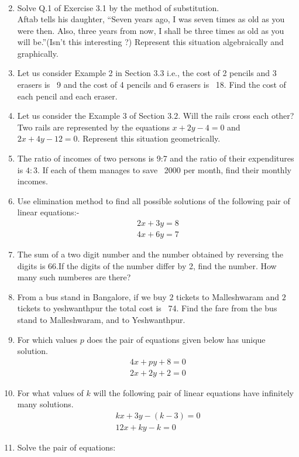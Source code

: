 \documentclass{article}
\theoremstyle{remark}
\begin{document}
\begin{enumerate}
\begin{align}
\end{align}
\item Solve Q.1 of Exercise 3.1 by the method of substitution.
\\ Aftab tells his daughter, \textquotedblleft Seven years ago, I was seven times as old as you were then. Also, three years from now, I shall be three times as old as you will be.\textquotedblright  (Isn't this interesting ?) Represent this situation algebraically and graphically.
\item Let us consider Example 2 in Section $3.3$ i.e., the cost of 2 pencils and 3 erasers is \rupee~9 and the cost of 4 pencils and 6 erasers is \rupee~18. Find the cost of each pencil and each eraser.
\item Let us consider the Example $3$ of Section $3.2$. Will the rails cross each other? Two rails are represented by the equations $x+2y-4=0$ and $2x+4y-12=0$. Represent this situation geometrically.
\item The ratio of incomes of two persons is 9:7 and the ratio of their expenditures is $4:3$. If each of them manages to save \rupee~2000 per month, find their monthly incomes.
\item Use elimination method to find all possible solutions of the following pair of linear equations:-
\begin{align}
2x+3y = 8 \\ 4x+6y = 7
\end{align}
\item The sum of a two digit number and the number obtained by reversing the digits is $66$.If the digits of the number differ by 2, find the number. How many such numberes are there?
\item From a bus stand in Bangalore, if we buy $2$ tickets to Malleshwaram and $2$ tickets to yeshwanthpur the total cost is \rupee~74. Find the fare from the bus stand to Malleshwaram, and to Yeshwanthpur.
\item For which values $p$ does the pair of equations given below has unique solution.
\begin{align}
4x+py+8 = 0 \\ 2x+2y+2 = 0
\end{align}
\item For what values of $k$ will the following pair of linear equations have infinitely many solutions.
\begin{align}
kx+3y-(k-3) = 0 \\ 12x+ky-k = 0
\end{align}
\item Solve the pair of equations:

\end{enumerate}
\end{document}
